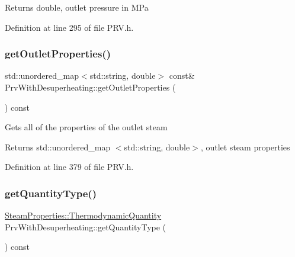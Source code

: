 \begin{DoxyReturn}{Returns}
double, outlet pressure in M\+Pa 
\end{DoxyReturn}


Definition at line 295 of file P\+R\+V.\+h.

\mbox{\label{class_prv_with_desuperheating_a870a97f42a06e2236b836d86b9fc64f5}} 
\subsubsection{\texorpdfstring{get\+Outlet\+Properties()}{getOutletProperties()}}
{\footnotesize\ttfamily std\+::unordered\+\_\+map$<$std\+::string, double$>$ const\& Prv\+With\+Desuperheating\+::get\+Outlet\+Properties (\begin{DoxyParamCaption}{ }\end{DoxyParamCaption}) const\hspace{0.3cm}{\ttfamily [inline]}}

Gets all of the properties of the outlet steam \begin{DoxyReturn}{Returns}
std\+::unordered\+\_\+map $<$std\+::string, double$>$, outlet steam properties 
\end{DoxyReturn}


Definition at line 379 of file P\+R\+V.\+h.

\mbox{\label{class_prv_with_desuperheating_acf4609b0d63c60ccad298b8a17533ba6}} 
\subsubsection{\texorpdfstring{get\+Quantity\+Type()}{getQuantityType()}}
{\footnotesize\ttfamily \hyperlink{class_steam_properties_ae0294bedf7d178c2d8fb6aed0f62fbff}{Steam\+Properties\+::\+Thermodynamic\+Quantity} Prv\+With\+Desuperheating\+::get\+Quantity\+Type (\begin{DoxyParamCaption}{ }\end{DoxyParamCaption}) const\hspace{0.3cm}{\ttfamily [inline]}}

